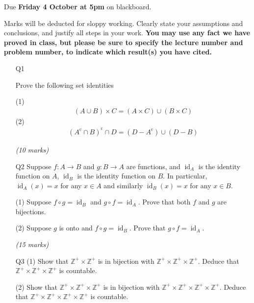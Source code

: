 \documentclass[a4paper]{gtart}
\begin{document}
Due \textbf{Friday 4 October at 5pm} on blackboard.

\medskip%

Marks will be deducted for sloppy working. Clearly state your assumptions and conclusions, and justify all steps in your work. \textbf{You may use any fact we have proved in class, but please be sure to specify the lecture number and problem number, to indicate which result(s) you have cited.}

\begin{enumerate}

\item[Q1]

Prove the following set identities

(1)
\begin{align*}
(A \cup B ) \times C = (A\times C) \cup (B\times C)
\end{align*} 
(2)
\begin{align*}
(A^{\operatorname{c}} \cap B)^{\operatorname{c}} \cap D = (D-A^{\operatorname{c}}) \cup (D-B)
\end{align*}

\hfill  \emph{(10 marks)}

\medskip 

\item[Q2]
 Suppose $f:A\to B$ and $g:B\to A$ are functions, and $\operatorname{id}_A$ is the identity function on $A$, $\operatorname{id}_B$ is the identity function on $B$. In particular,  $\operatorname{id}_A(x)=x$ for any $x\in A$ and similarly $\operatorname{id}_B(x)=x$ for any $x\in B$.

(1) Suppose $f\circ g= \operatorname{id}_B$ and  $g\circ f= \operatorname{id}_A$. Prove that both $f$ and $g$ are bijections.


(2) Suppose $g$ is onto and  $f\circ g= \operatorname{id}_B$. Prove that $g\circ f= \operatorname{id}_A$.

\hfill \emph{(15 marks)}

\medskip 

\item[Q3]
(1) Show that $\mathbb{Z}^+\times \mathbb{Z}^+$ is in bijection with $\mathbb{Z}^+\times \mathbb{Z}^+\times \mathbb{Z}^{+}$. Deduce that $\mathbb{Z}^+\times \mathbb{Z}^+\times \mathbb{Z}^{+}$ is countable. 


(2) Show that $\mathbb{Z}^+\times \mathbb{Z}^+\times \mathbb{Z}^+$ is in bijection with $\mathbb{Z}^+\times \mathbb{Z}^+\times \mathbb{Z}^{+}\times \mathbb{Z}^+$. Deduce that $\mathbb{Z}^+\times \mathbb{Z}^+\times \mathbb{Z}^{+}\times \mathbb{Z}^+$ is countable. 



\end{enumerate}
\end{document}
